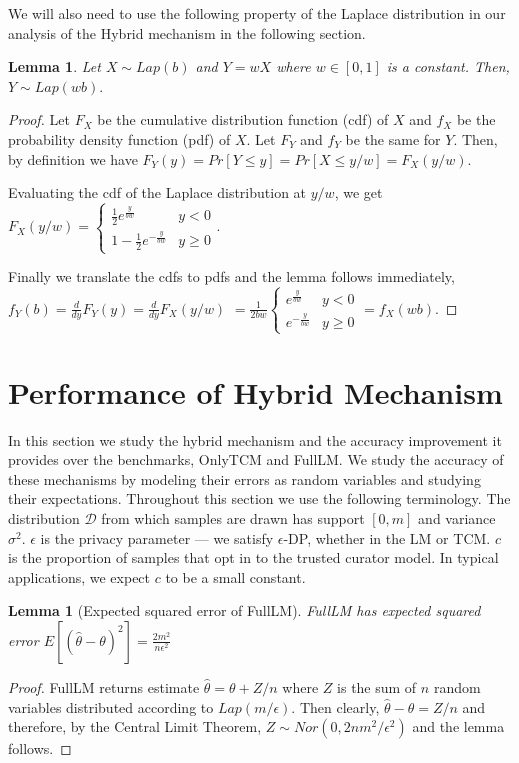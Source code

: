 \documentclass{article}
\theoremstyle{plain}
\newtheorem{lem}[thm]{Lemma}
\begin{document}
We will also need to use the following property of the Laplace distribution in our analysis of the Hybrid mechanism in the following section. 

\begin{lem} \label{wtimeslap}
Let $X \sim Lap(b)$ and $Y = wX$ where $w \in [0,1]$ is a constant. Then, 
$Y \sim Lap(wb).$
\end{lem}
\begin{proof}
Let $F_X$ be the cumulative distribution function (cdf) of $X$ and $f_X$ be the probability density function (pdf) of $X$. Let $F_Y$ and $f_Y$ be the same for $Y$. Then, by definition we have 
$F_Y(y) = Pr[Y \leq y] = Pr[X \leq y/w] = F_X(y/w).$
	
Evaluating the cdf of the Laplace distribution at $y/w$, we get 
$F_X(y/w) = 
	\begin{cases} 
      \frac{1}{2}e^{\frac{y}{bw}} & y < 0 \\
      1 - \frac{1}{2}e^{-\frac{y}{bw}} & y \geq 0 
	\end{cases} .$
	
Finally we translate the cdfs to pdfs and the lemma follows immediately, 
$f_Y(b) = \frac{d}{dy}F_Y(y) = \frac{d}{dy}F_X(y/w) $
$= \frac{1}{2bw}
	\begin{cases} 
      e^{\frac{y}{bw}} & y < 0 \\
      e^{-\frac{y}{bw}} & y \geq 0 
	\end{cases}
     = f_X(wb).$
\end{proof}



\section{Performance of Hybrid Mechanism}
In this section we study the hybrid mechanism and the accuracy improvement it provides over the benchmarks, OnlyTCM and FullLM. We study the accuracy of these mechanisms by modeling their errors as random variables and studying their expectations. Throughout this section we use the following terminology. The distribution $\mathcal{D}$ from which samples are drawn has support $[0,m]$ and variance $\sigma^2$. $\epsilon$ is the privacy parameter — we satisfy $\epsilon$-DP, whether in the LM or TCM. $c$ is the proportion of samples that opt in to the trusted curator model. In typical applications, we expect $c$ to be a small constant. 

\begin{lem}[Expected squared error of FullLM]
\label{MSE_FullLM}
FullLM has expected squared error
$E[(\hat{\theta} - \theta)^2] = \frac{2m^2}{n\epsilon^2}$
\end{lem}
\begin{proof}
FullLM returns estimate $\hat{\theta} = \theta + Z/n$ where $Z$ is the sum of $n$ random variables distributed according to $Lap(m/\epsilon)$. Then clearly, $\hat{\theta} - \theta = Z/n$ and therefore, by the Central Limit Theorem, $Z \sim Nor(0, 2nm^2/\epsilon^2)$ and the lemma follows. 
\end{proof}
\end{document}
